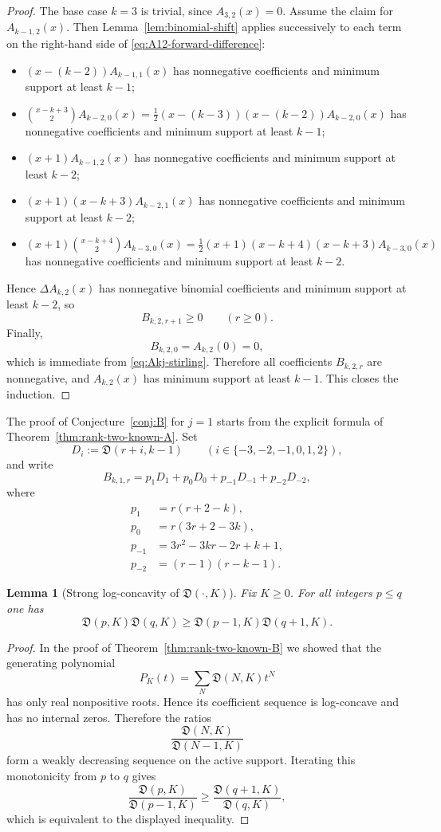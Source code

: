 \documentclass[11pt]{amsart}
\numberwithin{equation}{section}
\newtheorem{lemma}[theorem]{Lemma}
\theoremstyle{remark}
\newcommand{\Dder}{\mathfrak D}
\begin{document}
\begin{proof}
The base case $k=3$ is trivial, since $A_{3,2}(x)=0$.  Assume the claim for $A_{k-1,2}(x)$.  Then Lemma~\ref{lem:binomial-shift} applies successively to each term on the right-hand side of \eqref{eq:A12-forward-difference}:
\begin{itemize}
\item $(x-(k-2))A_{k-1,1}(x)$ has nonnegative coefficients and minimum support at least $k-1$;
\item $\binom{x-k+3}{2}A_{k-2,0}(x)=\frac12(x-(k-3))(x-(k-2))A_{k-2,0}(x)$ has nonnegative coefficients and minimum support at least $k-1$;
\item $(x+1)A_{k-1,2}(x)$ has nonnegative coefficients and minimum support at least $k-2$;
\item $(x+1)(x-k+3)A_{k-2,1}(x)$ has nonnegative coefficients and minimum support at least $k-2$;
\item $(x+1)\binom{x-k+4}{2}A_{k-3,0}(x)=\frac12(x+1)(x-k+4)(x-k+3)A_{k-3,0}(x)$ has nonnegative coefficients and minimum support at least $k-2$.
\end{itemize}
Hence $\Delta A_{k,2}(x)$ has nonnegative binomial coefficients and minimum support at least $k-2$, so
\[
  B_{k,2,r+1}\ge0\qquad(r\ge0).
\]
Finally,
\[
  B_{k,2,0}=A_{k,2}(0)=0,
\]
which is immediate from \eqref{eq:Akj-stirling}.  Therefore all coefficients $B_{k,2,r}$ are nonnegative, and $A_{k,2}(x)$ has minimum support at least $k-1$.  This closes the induction.
\end{proof}

The proof of Conjecture~\ref{conj:B} for $j=1$ starts from the explicit formula of Theorem~\ref{thm:rank-two-known-A}.  Set
\[
  D_i:=\Dder(r+i,k-1)\qquad(i\in\{-3,-2,-1,0,1,2\}),
\]
and write
\[
  B_{k,1,r}=p_1D_1+p_0D_0+p_{-1}D_{-1}+p_{-2}D_{-2},
\]
where
\begin{align*}
p_1&=r(r+2-k),\\
p_0&=r(3r+2-3k),\\
p_{-1}&=3r^2-3kr-2r+k+1,\\
p_{-2}&=(r-1)(r-k-1).
\end{align*}

\begin{lemma}[Strong log-concavity of $\Dder(\cdot,K)$]\label{lem:strong-log-D}
Fix $K\ge0$.  For all integers $p\le q$ one has
\[
  \Dder(p,K)\Dder(q,K)\ge \Dder(p-1,K)\Dder(q+1,K).
\]
\end{lemma}

\begin{proof}
In the proof of Theorem~\ref{thm:rank-two-known-B} we showed that the generating polynomial
\[
  P_K(t)=\sum_{N}\Dder(N,K)t^N
\]
has only real nonpositive roots.  Hence its coefficient sequence is log-concave and has no internal zeros.  Therefore the ratios
\[
  \frac{\Dder(N,K)}{\Dder(N-1,K)}
\]
form a weakly decreasing sequence on the active support.  Iterating this monotonicity from $p$ to $q$ gives
\[
  \frac{\Dder(p,K)}{\Dder(p-1,K)}
  \ge
  \frac{\Dder(q+1,K)}{\Dder(q,K)},
\]
which is equivalent to the displayed inequality.
\end{proof}
\end{document}
